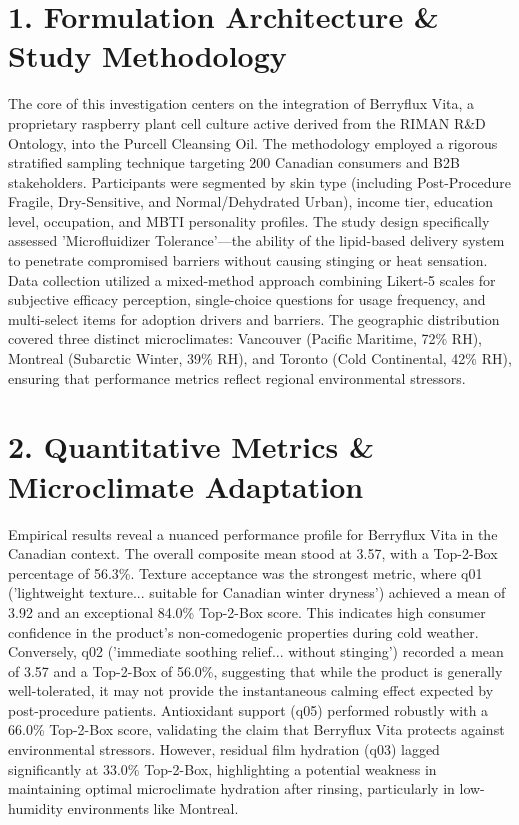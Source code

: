 \documentclass[10pt,twocolumn,a4paper]{article}
\begin{document}
\section{1. Formulation Architecture \& Study Methodology}
The core of this investigation centers on the integration of Berryflux Vita, a proprietary raspberry plant cell culture active derived from the RIMAN R\&D Ontology, into the Purcell Cleansing Oil. The methodology employed a rigorous stratified sampling technique targeting 200 Canadian consumers and B2B stakeholders. Participants were segmented by skin type (including Post-Procedure Fragile, Dry-Sensitive, and Normal/Dehydrated Urban), income tier, education level, occupation, and MBTI personality profiles. The study design specifically assessed 'Microfluidizer Tolerance'—the ability of the lipid-based delivery system to penetrate compromised barriers without causing stinging or heat sensation. Data collection utilized a mixed-method approach combining Likert-5 scales for subjective efficacy perception, single-choice questions for usage frequency, and multi-select items for adoption drivers and barriers. The geographic distribution covered three distinct microclimates: Vancouver (Pacific Maritime, 72\% RH), Montreal (Subarctic Winter, 39\% RH), and Toronto (Cold Continental, 42\% RH), ensuring that performance metrics reflect regional environmental stressors.
\section{2. Quantitative Metrics \& Microclimate Adaptation}
Empirical results reveal a nuanced performance profile for Berryflux Vita in the Canadian context. The overall composite mean stood at 3.57, with a Top-2-Box percentage of 56.3\%. Texture acceptance was the strongest metric, where q01 ('lightweight texture... suitable for Canadian winter dryness') achieved a mean of 3.92 and an exceptional 84.0\% Top-2-Box score. This indicates high consumer confidence in the product's non-comedogenic properties during cold weather. Conversely, q02 ('immediate soothing relief... without stinging') recorded a mean of 3.57 and a Top-2-Box of 56.0\%, suggesting that while the product is generally well-tolerated, it may not provide the instantaneous calming effect expected by post-procedure patients. Antioxidant support (q05) performed robustly with a 66.0\% Top-2-Box score, validating the claim that Berryflux Vita protects against environmental stressors. However, residual film hydration (q03) lagged significantly at 33.0\% Top-2-Box, highlighting a potential weakness in maintaining optimal microclimate hydration after rinsing, particularly in low-humidity environments like Montreal.
\end{document}
